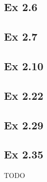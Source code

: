 \subsection*{Ex 2.6}

\subsection*{Ex 2.7}

\subsection*{Ex 2.10}

\subsection*{Ex 2.22}

\subsection*{Ex 2.29}

\subsection*{Ex 2.35}
TODO